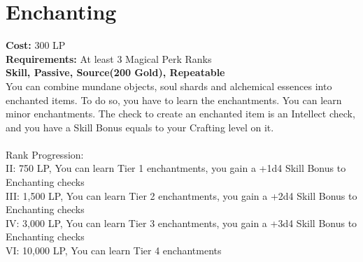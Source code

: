 \section{Enchanting}\label{perk:enchanting}
\textbf{Cost:} 300 LP\\
\textbf{Requirements:} At least 3 Magical Perk Ranks\\
\textbf{Skill, Passive, Source(200 Gold), Repeatable}\\
You can combine mundane objects, soul shards and alchemical essences into enchanted items.
To do so, you have to learn the enchantments.
You can learn minor enchantments.
The check to create an enchanted item is an Intellect check, and you have a Skill Bonus equals to your Crafting level on it.\\
\\
Rank Progression:\\
II: 750 LP, You can learn Tier 1 enchantments, you gain a +1d4 Skill Bonus to Enchanting checks\\
III: 1,500 LP, You can learn Tier 2 enchantments, you gain a +2d4 Skill Bonus to Enchanting checks\\
IV: 3,000 LP, You can learn Tier 3 enchantments, you gain a +3d4 Skill Bonus to Enchanting checks\\
VI: 10,000 LP, You can learn Tier 4 enchantments\\